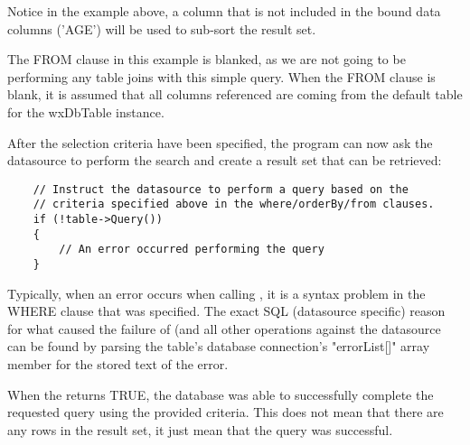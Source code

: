 Notice in the example above, a column that is not included in the bound 
data columns ('AGE') will be used to sub-sort the result set. 

The FROM clause in this example is blanked, as we are not going to be 
performing any table joins with this simple query.  When the FROM clause 
is blank, it is assumed that all columns referenced are coming from 
the default table for the wxDbTable instance.

After the selection criteria have been specified, the program can now 
ask the datasource to perform the search and create a result set that 
can be retrieved:

\begin{verbatim}
    // Instruct the datasource to perform a query based on the 
    // criteria specified above in the where/orderBy/from clauses.
    if (!table->Query())
    {
        // An error occurred performing the query
    }
\end{verbatim}

Typically, when an error occurs when calling , it is a 
syntax problem in the WHERE clause that was specified.  The exact SQL 
(datasource specific) reason for what caused the failure of  
(and all other operations against the datasource can be found by 
parsing the table's database connection's "errorList[]" array member for 
the stored text of the error.

When the  returns TRUE, the 
database was able to successfully complete the requested query using the 
provided criteria.  This does not mean that there are any rows in the 
result set, it just mean that the query was successful.


